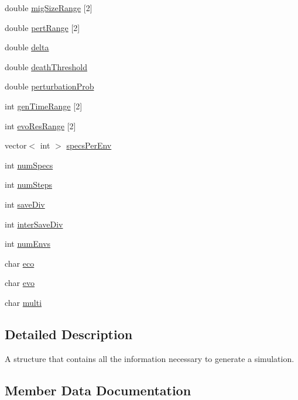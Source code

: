 \begin{DoxyCompactItemize}
\item 
double \hyperlink{structsimParams_a2486796d56e9fbe5d9f2dbd507a6ce5d}{mig\+Size\+Range} \mbox{[}2\mbox{]}
\item 
double \hyperlink{structsimParams_a9b9d328e41381a83004b5fa062248fc7}{pert\+Range} \mbox{[}2\mbox{]}
\item 
double \hyperlink{structsimParams_a1d2d1053c8780cea2eb1f703b1bcafd0}{delta}
\item 
double \hyperlink{structsimParams_aec04ef00f25e3bb5585a7a4b50c32b9a}{death\+Threshold}
\item 
double \hyperlink{structsimParams_aa07ddc0d55d057a586dc98ffd113e064}{perturbation\+Prob}
\item 
int \hyperlink{structsimParams_ace2069f1d65920fe32e4236c12e91ea9}{gen\+Time\+Range} \mbox{[}2\mbox{]}
\item 
int \hyperlink{structsimParams_a4121b97ac4b40f6d309693847309ce6b}{evo\+Res\+Range} \mbox{[}2\mbox{]}
\item 
vector$<$ int $>$ \hyperlink{structsimParams_aede5150c0b33bacae326638341a4e906}{specs\+Per\+Env}
\item 
int \hyperlink{structsimParams_a83b3c9f8e5dee0b7b4e63a17dc2646bd}{num\+Specs}
\item 
int \hyperlink{structsimParams_a027234312109ab21e3f8dacda4039c9f}{num\+Steps}
\item 
int \hyperlink{structsimParams_ad9fb5fcc3890d022270dbe00ec3a7c1e}{save\+Div}
\item 
int \hyperlink{structsimParams_a2114f7c6664772255e0e8afcf9334ebf}{inter\+Save\+Div}
\item 
int \hyperlink{structsimParams_a5d284deecb9cbd1b2680670822cae29a}{num\+Envs}
\item 
char \hyperlink{structsimParams_ac1a96378c33a770e34ffba03498735c9}{eco}
\item 
char \hyperlink{structsimParams_a26cb871bb244145cf0b4d1754864f276}{evo}
\item 
char \hyperlink{structsimParams_a2c0a57da585258a84362a2c297ee44cb}{multi}
\end{DoxyCompactItemize}


\subsection{Detailed Description}
A structure that contains all the information necessary to generate a simulation. 

\subsection{Member Data Documentation}
\hypertarget{structsimParams_a2674f228bf6b33bf35dc6d1cfb6befba}{}\label{structsimParams_a2674f228bf6b33bf35dc6d1cfb6befba} 
